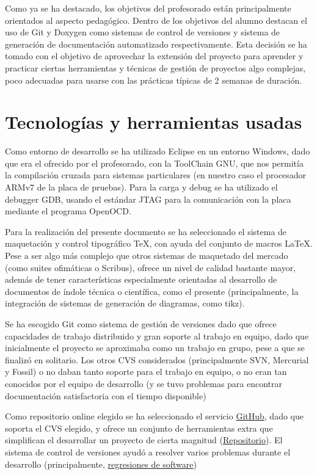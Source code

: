 \documentclass[12pt,letterpaper]{article}
\begin{document}
Como ya se ha destacado, los objetivos del profesorado están
principalmente orientados al aspecto pedagógico. Dentro de los
objetivos del alumno destacan el uso de Git y Doxygen como sistemas de
control de versiones y sistema de generación de documentación
automatizado respectivamente. Esta decisión se ha tomado con el
objetivo de aprovechar la extensión del proyecto para aprender y
practicar ciertas herramientas y técnicas de gestión de proyectos algo
complejas, poco adecuadas para usarse con las prácticas típicas de 2
semanas de duración.

\section{Tecnologías y herramientas usadas}
\label{sec:tecnologias}
\label{sec:herramientas}

Como entorno de desarrollo se ha utilizado Eclipse en un entorno
Windows, dado que era el ofrecido por el profesorado, con la ToolChain
GNU, que nos permitía la compilación cruzada para sistemas
particulares (en nuestro caso el procesador ARMv7 de la placa de
pruebas). Para la carga y debug se ha utilizado el debugger GDB,
usando el estándar JTAG para la comunicación con la placa mediante el
programa OpenOCD.

Para la realización del presente documento se ha seleccionado el
sistema de maquetación y control tipográfico \TeX, con ayuda del
conjunto de macros \LaTeX. Pese a ser algo más complejo que otros
sistemas de maquetado del mercado (como suites ofimáticas o Scribus),
ofrece un nivel de calidad bastante mayor, además de tener
características especialmente orientadas al desarrollo de documentos
de índole técnica o científica, como el presente (principalmente, la
integración de sistemas de generación de diagramas, como tikz).

Se ha escogido Git como sistema de gestión de versiones dado que
ofrece capacidades de trabajo distribuido y gran soporte al trabajo en
equipo, dado que inicialmente el proyecto se aproximaba como un
trabajo en grupo, pese a que se finalizó en solitario. Los otros CVS
considerados (principalmente SVN, Mercurial y Fossil) o no daban
tanto soporte para el trabajo en equipo, o no eran tan conocidos por
el equipo de desarrollo (y se tuvo problemas para encontrar
documentación satisfactoria con el tiempo disponible)

Como repositorio online elegido se ha seleccionado el servicio
\href{https://www.github.com}{GitHub}, dado que soporta el CVS
elegido, y ofrece un conjunto de herramientas extra que simplifican el
desarrollar un proyecto de cierta magnitud
(\href{https://www.github.com/wynro/proyecto\_hardware}{Repositorio}).
El sistema de control de versiones ayudó a resolver varios problemas
durante el desarrollo (principalmente,
\href{https://en.wikipedia.org/wiki/Software\_regression}{regresiones
  de software})
\end{document}
